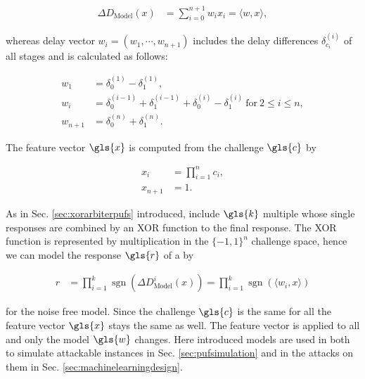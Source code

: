 \begin{align}
\Delta D_{\mathrm{Model}}(x) &= \sum_{i=0}^{n+1} w_i x_i = \langle w,x\rangle, \label{equ:pufmodelw}
\end{align}

whereas delay vector $w_i = (w_1, \cdots, w_{n+1})$ includes the delay differences $\delta_{c_i}^{(i)}$ of all stages and is calculated as follows:

\begin{align*}
w_1 &= \delta_{0}^{(1)} - \delta_{1}^{(1)},\\
w_i &= \delta_{0}^{(i-1)} + \delta_{1}^{(i-1)} + \delta_{0}^{(i)} - \delta_{1}^{(i)}\ \text{for}\ 2 \le i \le n,\\
w_{n+1} &= \delta_{0}^{(n)} + \delta_{1}^{(n)}.
\end{align*}
 
The feature vector $\gls{x}$ is computed from the challenge $\gls{c}$ by

\begin{equation}
\begin{aligned}
x_i &= \prod_{i=1}^n c_i,\\ 
x_{n+1} &= 1. \label{equ:featurevector}
\end{aligned}
\end{equation}

As in Sec. \ref{sec:xorarbiterpufs} introduced, \xpufs include $\gls{k}$ multiple \apufs whose single responses are combined by an \ac{XOR} function to the final response.
The \ac{XOR} function is represented by multiplication in the $\{-1,1\}^n$ challenge space, hence we can model the response $\gls{r}$ of a \xpuf by

\begin{align*}
r &= \prod_{i=1}^k \operatorname{sgn}(\Delta D_{\mathrm{Model}}^i(x)) = \prod_{i=1}^k \operatorname{sgn}(\langle w_i,x\rangle)
\end{align*}

for the noise free \xpuf model.
Since the challenge $\gls{c}$ is the same for all \apufs the feature vector $\gls{x}$ stays the same as well.
The feature vector is applied to all \apufs and only the \apuf model $\gls{w}$ changes. %
Here introduced models are used in both to simulate attackable \apuf instances in Sec. \ref{sec:pufsimulation} and in the attacks on them in Sec. \ref{sec:machinelearningdesign}.



